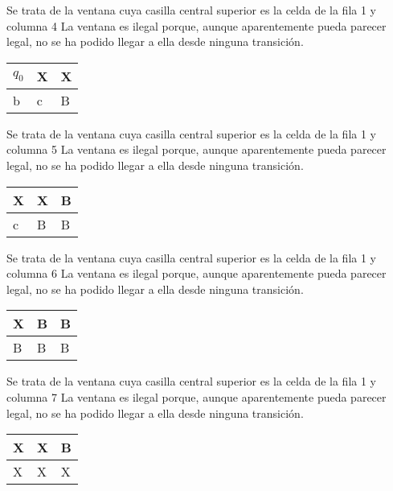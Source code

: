 ﻿\documentclass[a4paper,10pt]{article}
\begin{document}
Se trata de la ventana cuya casilla central superior es la celda de la fila 1 y columna 4\newline
La ventana es ilegal porque, aunque aparentemente pueda parecer legal, no se ha podido llegar a ella desde ninguna transición.\newline
\begin{table}[h!]
\centering
\begin{tabular}{|l|l|l|}
\hline
	$q_0$  &   X   &   X	\\ \hline
	b   &   c   &   B	\\ \hline
\end{tabular}
\end{table}

Se trata de la ventana cuya casilla central superior es la celda de la fila 1 y columna 5\newline
La ventana es ilegal porque, aunque aparentemente pueda parecer legal, no se ha podido llegar a ella desde ninguna transición.\newline
\begin{table}[h!]
\centering
\begin{tabular}{|l|l|l|}
\hline
	X   &   X   &   B	\\ \hline
	c   &   B   &   B	\\ \hline
\end{tabular}
\end{table}

Se trata de la ventana cuya casilla central superior es la celda de la fila 1 y columna 6\newline
La ventana es ilegal porque, aunque aparentemente pueda parecer legal, no se ha podido llegar a ella desde ninguna transición.\newline
\begin{table}[h!]
\centering
\begin{tabular}{|l|l|l|}
\hline
	X   &   B   &   B	\\ \hline
	B   &   B   &   B	\\ \hline
\end{tabular}
\end{table}

Se trata de la ventana cuya casilla central superior es la celda de la fila 1 y columna 7\newline
La ventana es ilegal porque, aunque aparentemente pueda parecer legal, no se ha podido llegar a ella desde ninguna transición.\newline
\begin{table}[h!]
\centering
\begin{tabular}{|l|l|l|}
\hline
	X   &   X   &   B	\\ \hline
	X   &   X   &   X	\\ \hline
\end{tabular}
\end{table}
\end{document}
